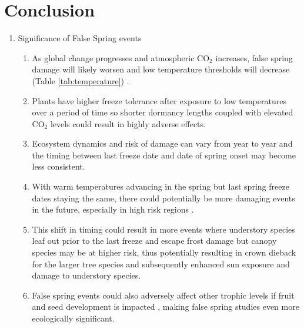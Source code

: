 \documentclass{article}\usepackage[]{graphicx}\usepackage[]{color}
\begin{document}

\section*{Conclusion}
\begin{enumerate}
\item Significance of False Spring events
\begin{enumerate}
\item As global change progresses and atmospheric CO$_{\text{2}}$ increases, false spring damage will likely worsen and low temperature thresholds will decrease (Table \ref{tab:temperature}) \citep{Beerling2001, Barker2005}.
\item Plants have higher freeze tolerance after exposure to low temperatures over a period of time \citep{Thomashow1999} so shorter dormancy lengths coupled with elevated CO$_{\text{2}}$ levels could result in highly adverse effects. 
\item Ecosystem dynamics and risk of damage can vary from year to year and the timing between last freeze date and date of spring onset may become less consistent. 
\item With warm temperatures advancing in the spring but last spring freeze dates staying the same, there could potentially be more damaging events in the future, especially in high risk regions \citep{Gu2008, Inouye2008}.
\item This shift in timing could result in more events where understory species leaf out prior to the last freeze and escape frost damage but canopy species may be at higher risk, thus potentially resulting in crown dieback for the larger tree species and subsequently enhanced sun exposure and damage to understory species.
\item False spring events could also adversely affect other trophic levels if fruit and seed development is impacted \citep{Gu2008}, making false spring studies even more ecologically significant.
\end{enumerate}


\end{enumerate}
\end{document}
